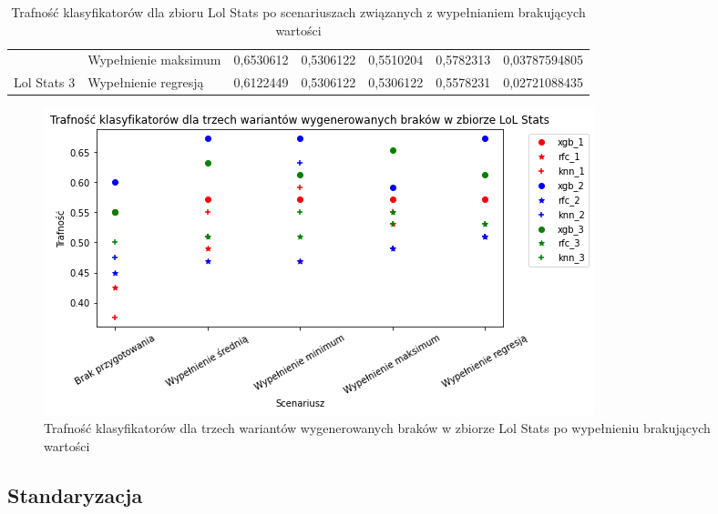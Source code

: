 \documentclass{book}
\begin{document}
\begin{table}[H]
\begin{tabular}{|l|l|r|r|r|r|r|}
                                  & Wypełnienie maksimum & \cellcolor[HTML]{67FD9A}0,6530612                                                & 0,5306122                                                                                & \cellcolor[HTML]{67FD9A}0,5510204                                                                  & \cellcolor[HTML]{FFCC67}0,5782313                                               & \cellcolor[HTML]{FFCC67}0,03787594805                                            \\ \cline{2-7} 
    \multirow{-5}{*}{Lol Stats 3} & Wypełnienie regresją & 0,6122449                                                                        & 0,5306122                                                                                & 0,5306122                                                                                          & 0,5578231                                                                       & 0,02721088435                                                                    \\ \hline
    \end{tabular}
    \caption{Trafność klasyfikatorów dla zbioru Lol Stats po scenariuszach związanych z wypełnianiem brakujących wartości}
    \end{table}


                \begin{figure}[H]
                    \centerline{\includegraphics[scale=0.8]{Lol_stats_Wypełnienie_brakujących}}
                    \centering
                    \caption{Trafność klasyfikatorów dla trzech wariantów wygenerowanych braków w zbiorze Lol Stats po wypełnieniu brakujących wartości}
                    \end{figure}

\subsection{Standaryzacja}
\end{document}
